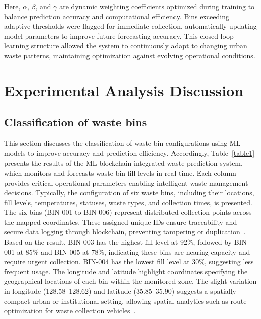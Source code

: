 \documentclass[final,5p,times,twocolumn]{elsarticle}
\begin{document}
Here, $\alpha$, $\beta$, and $\gamma$ are dynamic weighting coefficients optimized during training to balance prediction accuracy and computational efficiency. Bins exceeding adaptive thresholds were flagged for immediate collection, automatically updating model parameters to improve future forecasting accuracy. This closed-loop learning structure allowed the system to continuously adapt to changing urban waste patterns, maintaining optimization against evolving operational conditions.

\section{Experimental Analysis Discussion}
\subsection{Classification of waste bins}
This section discusses the classification of waste bin configurations using ML models to improve accuracy and prediction efficiency. Accordingly, Table~\ref{table1} presents the results of the ML-blockchain-integrated waste prediction system, which monitors and forecasts waste bin fill levels in real time. Each column provides critical operational parameters enabling intelligent waste management decisions. Typically, the configuration of six waste bins, including their locations, fill levels, temperatures, statuses, waste types, and collection times, is presented. The six bins (BIN-001 to BIN-006) represent distributed collection points across the mapped coordinates. These assigned unique IDs ensure traceability and secure data logging through blockchain, preventing tampering or duplication~\cite{belhiah2024optimising, melare2017technologies}. Based on the result, BIN-003 has the highest fill level at 92\%, followed by BIN-001 at 85\% and BIN-005 at 78\%, indicating these bins are nearing capacity and require urgent collection. BIN-004 has the lowest fill level at 30\%, suggesting less frequent usage. The longitude and latitude highlight coordinates specifying the geographical locations of each bin within the monitored zone. The slight variation in longitude (128.58--128.62) and latitude (35.85--35.90) suggests a spatially compact urban or institutional setting, allowing spatial analytics such as route optimization for waste collection vehicles~\cite{melare2017technologies}. 
\end{document}
